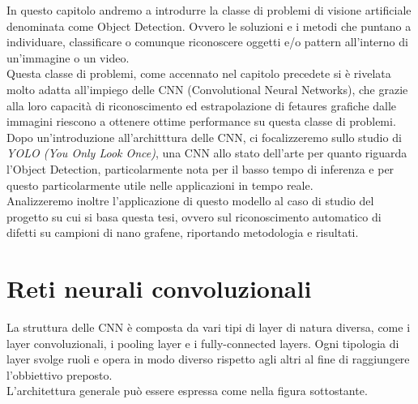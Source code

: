 \documentclass[12pt,a4paper,openright,twoside]{report}
\begin{document}
In questo capitolo andremo a introdurre la classe di problemi di visione artificiale denominata come Object Detection. Ovvero le soluzioni e i metodi che puntano a individuare, classificare o comunque riconoscere oggetti e/o pattern all'interno di un'immagine o un video. \\
Questa classe di problemi, come accennato nel capitolo precedete si è rivelata molto adatta all'impiego delle CNN (Convolutional Neural Networks), che grazie alla loro capacità di riconoscimento ed estrapolazione di fetaures grafiche dalle immagini riescono a ottenere ottime performance su questa classe di problemi.\\
Dopo un'introduzione all'architttura delle CNN, ci focalizzeremo sullo studio di \emph{YOLO (You Only Look Once)}, una CNN allo stato dell'arte per quanto riguarda l'Object Detection, particolarmente nota per il basso tempo di inferenza e per questo particolarmente utile nelle applicazioni in tempo reale.\\
Analizzeremo inoltre l'applicazione di questo modello al caso di studio del progetto su cui si basa questa tesi, ovvero sul riconoscimento automatico di difetti su campioni di nano grafene, riportando metodologia e risultati.
\section{Reti neurali convoluzionali}
La struttura delle CNN è composta da vari tipi di layer di natura diversa, come i layer convoluzionali, i pooling layer e i fully-connected layers. 
Ogni tipologia di layer svolge ruoli e opera in modo diverso rispetto agli altri al fine di raggiungere l'obbiettivo preposto.
\\L'architettura generale può essere espressa come nella figura sottostante.\\
\end{document}
